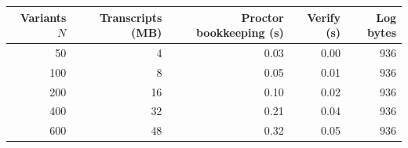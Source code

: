 \begin{tabular}{rrrrr}
\toprule
Variants $N$ & Transcripts (MB) & Proctor bookkeeping (s) & Verify (s) & Log bytes \\
\midrule
50 & 4 & 0.03 & 0.00 & 936 \\
100 & 8 & 0.05 & 0.01 & 936 \\
200 & 16 & 0.10 & 0.02 & 936 \\
400 & 32 & 0.21 & 0.04 & 936 \\
600 & 48 & 0.32 & 0.05 & 936 \\
\bottomrule
\end{tabular}
